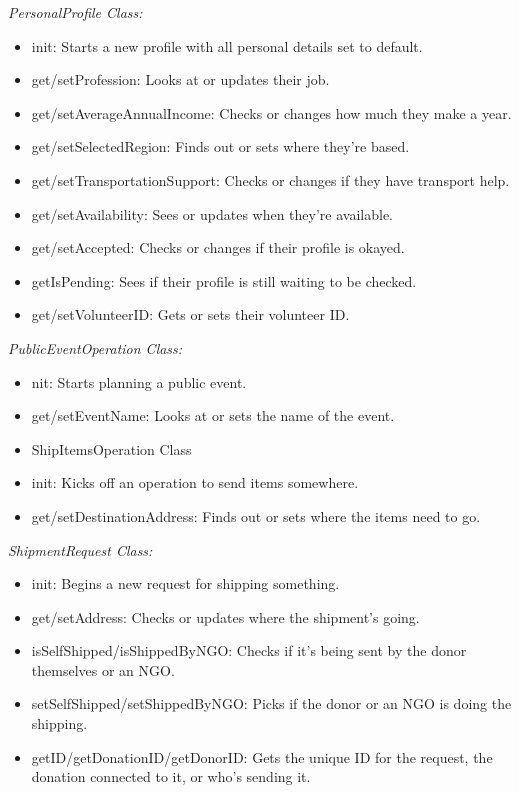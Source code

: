 \documentclass[a4paper,12pt]{report}
\begin{document}
			\textit{PersonalProfile Class:} 
			\begin{itemize}
			\item	init: Starts a new profile with all personal details set to default.
			\item	get/setProfession: Looks at or updates their job.
			\item	get/setAverageAnnualIncome: Checks or changes how much they make a year.
			\item	get/setSelectedRegion: Finds out or sets where they’re based.
			\item	get/setTransportationSupport: Checks or changes if they have transport help.
			\item	get/setAvailability: Sees or updates when they’re available.
			\item	get/setAccepted: Checks or changes if their profile is okayed.
			\item	getIsPending: Sees if their profile is still waiting to be checked.
			\item	get/setVolunteerID: Gets or sets their volunteer ID.
		\end{itemize}
				
					\textit{PublicEventOperation Class:} 
				\begin{itemize}
					\item	nit: Starts planning a public event.
					\item	get/setEventName: Looks at or sets the name of the event.
					\item	ShipItemsOperation Class
					
					\item	init: Kicks off an operation to send items somewhere.
					\item	get/setDestinationAddress: Finds out or sets where the items need to go.
					
			\end{itemize}
			
			
			\textit{ShipmentRequest Class:} 
			\begin{itemize}
		\item	init: Begins a new request for shipping something.
		\item	get/setAddress: Checks or updates where the shipment's going.
		\item	isSelfShipped/isShippedByNGO: Checks if it’s being sent by the donor themselves or an NGO.
		\item	setSelfShipped/setShippedByNGO: Picks if the donor or an NGO is doing the shipping.
		\item	getID/getDonationID/getDonorID: Gets the unique ID for the request, the donation connected to it, or who's sending it.
				
			\end{itemize}
			
\end{document}
